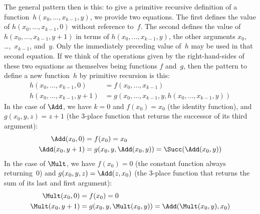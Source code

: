 \documentclass[../../../include/open-logic-section]{subfiles}
\begin{document}
The general pattern then is this: to give a primitive recursive
definition of a function~$h(x_0, \dots, x_{k-1}, y)$, we provide two
equations. The first defines the value of $h(x_0, \dots, x_{k-1}, 0)$
without reference to~$f$. The second defines the value of $h(x_0,
\dots, x_{k-1}, y+1)$ in terms of $h(x_0, \dots, x_{k-1}, y)$, the other
arguments $x_0$, \dots,~$x_{k-1}$, and~$y$. Only the immediately preceding
value of~$h$ may be used in that second equation.  If we think of the
operations given by the right-hand-sides of these two equations as
themselves being functions $f$ and~$g$, then the pattern to define a
new function~$h$ by primitive recursion is this:
\begin{align*}
  h(x_0, \dots, x_{k-1}, 0) & = f(x_0, \dots, x_{k-1})\\
  h(x_0, \dots, x_{k-1}, y+1) & =
  g(x_0, \dots, x_{k-1}, y, h(x_0, \dots, x_{k-1}, y))
\end{align*}  
In the case of $\Add$, we have $k=0$ and $f(x_0) = x_0$ (the
identity function), and $g(x_0, y, z) = z + 1$ (the $3$-place function
that returns the successor of its third argument):
\begin{align*}
  \Add(x_0, 0) & = f(x_0) = x_0\\
  \Add(x_0, y+1) & = g(x_0, y, \Add(x_0, y)) =
  \Succ(\Add(x_0, y))
\end{align*}
In the case of $\Mult$, we have $f(x_0) = 0$ (the constant
function always returning~$0$) and $g(x_0, y, z) = \Add(z,x_0)$
(the $3$-place function that returns the sum of its last and first
argument):
\begin{align*}
  \Mult(x_0,0) & =  f(x_0) = 0 \\
  \Mult(x_0,y+1) & =  g(x_0, y, \Mult(x_0,y)) =
  \Add(\Mult(x_0,y), x_0)
\end{align*}
\end{document}
